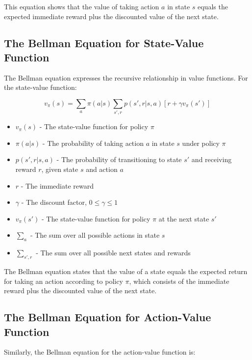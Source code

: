 \documentclass[12pt,a4paper]{article}
\begin{document}
This equation shows that the value of taking action $a$ in state $s$ equals the expected immediate reward plus the discounted value of the next state.

\subsection{The Bellman Equation for State-Value Function}

The Bellman equation expresses the recursive relationship in value functions. For the state-value function:

\begin{equation}
v_\pi(s) = \sum_{a} \pi(a|s) \sum_{s',r} p(s',r|s,a) [r + \gamma v_\pi(s')]
\end{equation}

\begin{tcolorbox}[title=Notation Overview]
\begin{itemize}
    \item $v_\pi(s)$ - The state-value function for policy $\pi$
    \item $\pi(a|s)$ - The probability of taking action $a$ in state $s$ under policy $\pi$
    \item $p(s',r|s,a)$ - The probability of transitioning to state $s'$ and receiving reward $r$, given state $s$ and action $a$
    \item $r$ - The immediate reward
    \item $\gamma$ - The discount factor, $0 \leq \gamma \leq 1$
    \item $v_\pi(s')$ - The state-value function for policy $\pi$ at the next state $s'$
    \item $\sum_{a}$ - The sum over all possible actions in state $s$
    \item $\sum_{s',r}$ - The sum over all possible next states and rewards
\end{itemize}
\end{tcolorbox}

The Bellman equation states that the value of a state equals the expected return for taking an action according to policy $\pi$, which consists of the immediate reward plus the discounted value of the next state.

\subsection{The Bellman Equation for Action-Value Function}

Similarly, the Bellman equation for the action-value function is:
\end{document}
